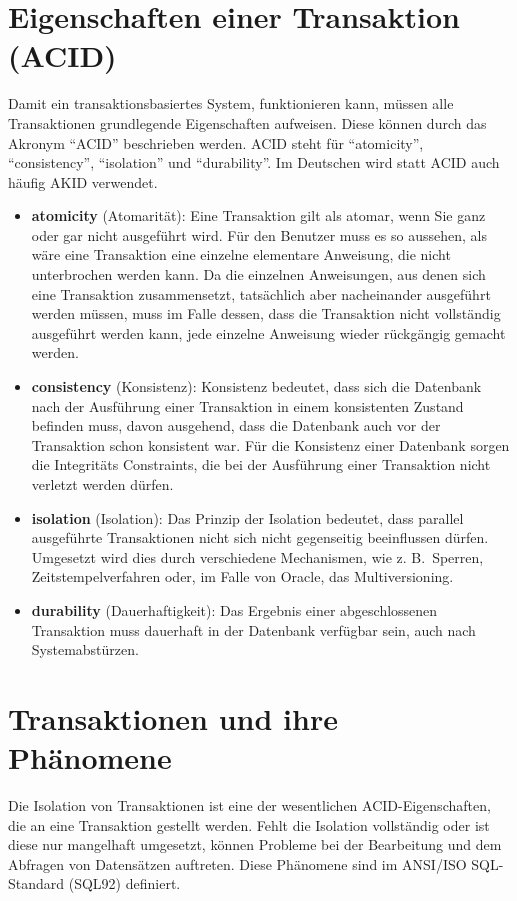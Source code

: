     \section{Eigenschaften einer Transaktion (ACID)}
      Damit ein transaktionsbasiertes System, funktionieren kann, m\"ussen alle
      Transaktionen grundlegende Eigenschaften aufweisen. Diese k\"onnen durch das Akronym
      \enquote{ACID} beschrieben werden. ACID steht f\"ur \enquote{atomicity},
     \enquote{consistency}, \enquote{isolation} und \enquote{durability}. Im
     Deutschen wird statt ACID auch h\"aufig AKID verwendet.
      \begin{itemize}
        \item \textbf{atomicity} (Atomarit\"at): Eine Transaktion gilt als
        atomar, wenn Sie ganz oder gar nicht ausgef\"uhrt wird. F\"ur den
        Benutzer muss es so aussehen, als w\"are eine Transaktion eine einzelne
        elementare Anweisung, die nicht unterbrochen werden kann. Da die
        einzelnen Anweisungen, aus denen sich eine Transaktion zusammensetzt,
        tats\"achlich aber nacheinander ausgef\"uhrt werden m\"ussen, muss im
        Falle dessen, dass die Transaktion nicht vollst\"andig ausgef\"uhrt
        werden kann, jede einzelne Anweisung wieder r\"uckg\"angig gemacht
        werden.
        \item \textbf{consistency} (Konsistenz): Konsistenz bedeutet, dass sich die Datenbank nach der Aus\-f\"uh\-rung einer Transaktion in einem konsistenten Zustand befinden muss, davon ausgehend, dass die Datenbank auch vor der Transaktion schon konsistent war. F\"ur die Konsistenz einer Datenbank sorgen die Integrit\"ats Constraints, die bei der Ausf\"uhrung einer Transaktion nicht verletzt werden d\"urfen.
        \item \textbf{isolation} (Isolation): Das Prinzip der Isolation
        bedeutet, dass parallel ausgef\"uhrte Transaktionen nicht sich nicht       
        gegenseitig beeinflussen d\"urfen. Umgesetzt wird dies durch
        verschiedene Mechanismen, wie z. B.~Sperren, Zeitstempelverfahren oder,
        im Falle von Oracle, das Multiversioning.
        \item \textbf{durability} (Dauerhaftigkeit): Das Ergebnis einer
        abgeschlossenen Transaktion muss dauerhaft in der Datenbank verf\"ugbar
        sein, auch nach System\-ab\-st\"ur\-zen.
      \end{itemize}
    \section{Transaktionen und ihre Ph\"anomene}
      Die Isolation von Transaktionen ist eine der wesentlichen ACID-Eigenschaften, die an eine Transaktion gestellt werden. Fehlt die Isolation vollst\"andig oder ist diese nur mangelhaft umgesetzt, k\"onnen Probleme bei der Bearbeitung und dem Abfragen von Datens\"atzen auftreten. Diese Ph\"anomene sind im ANSI/ISO SQL-Standard (SQL92) definiert.
